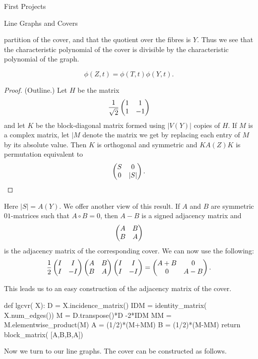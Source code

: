 \begin{chap}{First Projects}
\begin{sect}{Line Graphs and Covers}
\begin{para}
partition of the cover, and that the quotient over the fibres is $Y$. Thus
we see that the characteristic polynomial of the cover is divisible
by the characteristic polynomial of the graph.
\end{para}
%
\begin{para}
%
\begin{lemma}
\begin{statement}
\[
        \phi(Z,t) =\phi(T,t)\phi(Y,t).
\]
\end{statement}    
\begin{proof}
(Outline.) Let $H$ be the matrix
\[
    \frac{1}{\sqrt{2}} \begin{pmatrix} 1&1\\1&-1 \end{pmatrix}
\]
and let $K$ be the block-diagonal matrix formed using $|V(Y)|$ copies of $H$.
If $M$ is a complex matrix, let $|M$ denote the matrix we get by replacing each entry
of $M$ by its absolute value.
Then $K$ is orthogonal and symmetric and $KA(Z)K$ is permutation equivalent to 
\[
    \begin{pmatrix} S&0\\0&|S| \end{pmatrix}.
\]
\end{proof}
\end{lemma}
\end{para}
%
\begin{para}
Here $|S|=A(Y)$. We offer another view of this result.
If $A$ and $B$ are symmetric $01$-matrices such that $A\circ B=0$,
then $A-B$ is a signed adjacency matrix and
\[
    \begin{pmatrix} A&B\\B&A \end{pmatrix}
\]
is the adjacency matrix of the corresponding cover.
We can now use the following:
\[
    \frac12\begin{pmatrix} I&I\\I&-I \end{pmatrix}\begin{pmatrix} A&B\\B&A \end{pmatrix}\begin{pmatrix} I&I\\I&-I \end{pmatrix}
        =\begin{pmatrix} A+B&0\\0&A-B \end{pmatrix}.
\]
\end{para}
%
\begin{para}
This leads us to an easy construction of the adjacency matrix of the cover.
\end{para}
%
\begin{sagecode}
\begin{sageinput}
def lgcvr( X):
    D = X.incidence_matrix()
    IDM = identity_matrix( X.num_edges())
    M = D.transpose()*D -2*IDM
    MM = M.elementwise_product(M)
    A = (1/2)*(M+MM)
    B = (1/2)*(M-MM)
    return block_matrix( [A,B,B,A])
\end{sageinput}
\end{sagecode}
%
\begin{para}
Now we turn to our line graphs. The cover can be constructed as follows.

\end{para}
\end{sect}
\end{chap}
